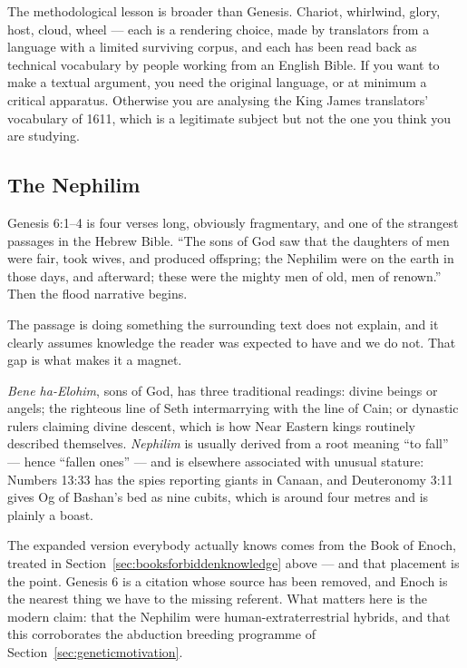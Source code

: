 The methodological lesson is broader than Genesis.  Chariot,
whirlwind, glory, host, cloud, wheel --- each is a rendering choice, made by translators from a
language with a limited surviving corpus, and each has been read back as technical vocabulary by
people working from an English Bible. If you want to make a textual argument, you need the
original language, or at minimum a critical apparatus. Otherwise you are analysing the King
James translators' vocabulary of 1611, which is a legitimate subject but not the one you think
you are studying.

\subsection{The Nephilim}\label{sec:nephilim}

Genesis 6:1--4 is four verses long, obviously fragmentary, and one of the strangest passages in
the Hebrew Bible. ``The sons of God saw that the daughters of men were fair, took wives, and
produced offspring; the Nephilim were on the earth in those days, and afterward; these were the
mighty men of old, men of renown.'' Then the flood narrative begins.

The passage is doing something the surrounding text does not explain, and it clearly assumes
knowledge the reader was expected to have and we do not. That gap is what makes it a magnet.

\emph{Bene ha-Elohim}, sons of God, has three traditional readings: divine beings or angels; the
righteous line of Seth intermarrying with the line of Cain; or dynastic rulers claiming divine
descent, which is how Near Eastern kings routinely described themselves. \emph{Nephilim} is
usually derived from a root meaning ``to fall'' --- hence ``fallen ones'' --- and is elsewhere
associated with unusual stature: Numbers 13:33 has the spies reporting giants in Canaan, and
Deuteronomy 3:11 gives Og of Bashan's bed as nine cubits, which is around four metres and is
plainly a boast.

The expanded version everybody actually knows comes from the Book of Enoch, treated in
Section~\ref{sec:booksforbiddenknowledge} above --- and that placement is the point. Genesis 6
is a citation whose source has been removed, and Enoch is the nearest thing we have to the
missing referent. What matters here is the modern claim: that the Nephilim were
human-extraterrestrial hybrids, and that this corroborates the abduction breeding programme of
Section~\ref{sec:geneticmotivation}.


